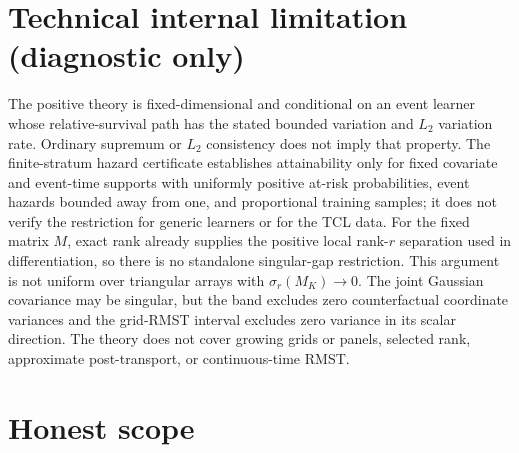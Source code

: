 \documentclass{article}
\begin{document}
\section*{Technical internal limitation (diagnostic only)}

The positive theory is fixed-dimensional and conditional on an event learner whose relative-survival path has the stated bounded variation and \(L_2\) variation rate. Ordinary supremum or \(L_2\) consistency does not imply that property. The finite-stratum hazard certificate establishes attainability only for fixed covariate and event-time supports with uniformly positive at-risk probabilities, event hazards bounded away from one, and proportional training samples; it does not verify the restriction for generic learners or for the TCL data. For the fixed matrix \(M\), exact rank already supplies the positive local rank-\(r\) separation used in differentiation, so there is no standalone singular-gap restriction. This argument is not uniform over triangular arrays with \(\sigma_r(M_K)\to0\). The joint Gaussian covariance may be singular, but the band excludes zero counterfactual coordinate variances and the grid-RMST interval excludes zero variance in its scalar direction. The theory does not cover growing grids or panels, selected rank, approximate post-transport, or continuous-time RMST.

\section{Honest scope}
\end{document}

